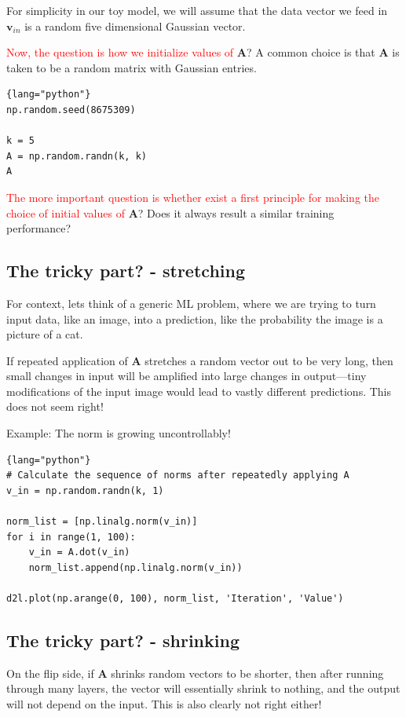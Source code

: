 For simplicity in our toy model, we will assume that the data vector we feed in
$\mathbf{v}_{in}$ is a random five dimensional Gaussian vector.

\textcolor{red}{Now, the question is how we initialize values of} $\mathbf{A}$? 
A common choice is that $\mathbf{A}$ is taken to be a random matrix
with Gaussian entries.

\begin{lstlisting}{lang="python"}
np.random.seed(8675309)

k = 5
A = np.random.randn(k, k)
A
\end{lstlisting}

\textcolor{red}{The more important question is whether exist a first principle
for making the choice of initial values of } $\mathbf{A}$? Does it always result
a similar  training performance?



\subsection{The tricky part? - stretching}

For context, lets think of a generic ML problem, where we are trying to turn
input data, like an image, into a prediction, like the probability the image is
a picture of a cat.

If repeated application of $\mathbf{A}$ stretches a random vector out to be very long,
then small changes in input will be amplified into large changes in output—tiny
modifications of the input image would lead to vastly different predictions.
This does not seem right!

Example: The norm is growing uncontrollably!
\begin{lstlisting}{lang="python"}
# Calculate the sequence of norms after repeatedly applying A
v_in = np.random.randn(k, 1)

norm_list = [np.linalg.norm(v_in)]
for i in range(1, 100):
    v_in = A.dot(v_in)
    norm_list.append(np.linalg.norm(v_in))

d2l.plot(np.arange(0, 100), norm_list, 'Iteration', 'Value')
\end{lstlisting}

\subsection{The tricky part? - shrinking}

On the flip side, if $\mathbf{A}$ shrinks random vectors to be shorter, then after
running through many layers, the vector will essentially shrink to nothing, and
the output will not depend on the input. This is also clearly not right either!

